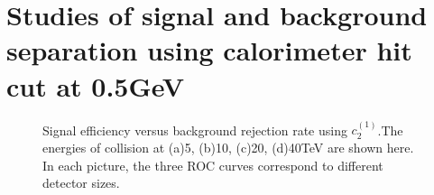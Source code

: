 \documentclass[final,1p,11pt]{elsarticle}
\begin{document}
\section{Studies of signal and background separation using calorimeter hit cut at 0.5GeV}

\begin{figure}
\begin{center}
\end{center}
\caption{Signal efficiency versus background rejection rate using $c_2^{(1)}$.The energies of collision at (a)5, (b)10, (c)20, (d)40TeV are shown here. In each picture, the three ROC curves correspond to different detector sizes.}
\label{fig:rawhit_0.5GeV_c2b1}
\end{figure}
\end{document}
